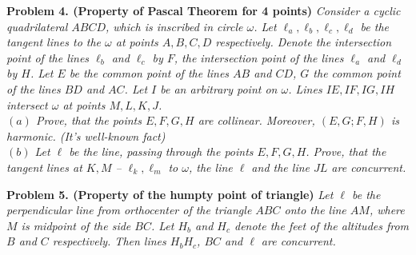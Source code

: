 \documentclass[12pt]{extarticle}
\begin{document}
\textbf{Problem 4. (Property of Pascal Theorem for 4 points)}
\textit{
Consider a cyclic quadrilateral \(ABCD\), which is inscribed in circle 
\(\omega\). Let \(\ell_a, \ell_b, \ell_c, \ell_d\) be the tangent 
lines to the \(\omega\) at points \(A,B,C,D\) respectively. 
Denote the intersection point of the lines \(\ell_b\) and \(\ell_c\) 
by \(F\), the intersection point of the lines \(\ell_a\) and \(\ell_d\) 
by \(H\). Let \(E\) be the common point of the lines \(AB\) and 
\(CD\), \(G\) the common point of the lines \(BD\) and \(AC\). 
Let \(I\) be an arbitrary point on \(\omega\). Lines \(IE, IF, IG, IH\) 
intersect \(\omega\) at points \(M,L,K,J\).\\
\((a)\) Prove, that the points \(E,F,G,H\) are collinear. Moreover, 
\((E,G;F,H)\) is harmonic. (It's well-known fact) \\
\((b)\) Let \(\ell\) be the line, passing through the points \(E,F,G,H\). 
Prove, that the tangent lines at \(K,M\) -- \(\ell_k, \ell_m\) 
to \(\omega\), the line \(\ell\) and the line \(JL\) are concurrent.\\
}


\textbf{Problem 5. (Property of the humpty point of triangle)}
\textit{
Let \(\ell\) be the perpendicular line from orthocenter of the triangle 
\(ABC\) onto the line \(AM\), where \(M\) is midpoint of the side \(BC\).
Let \(H_b\) and \(H_c\) denote the feet of the altitudes from \(B\) and 
\(C\) respectively. Then lines \(H_bH_c\), \(BC\) and \(\ell\) are 
concurrent.
}
\end{document}
